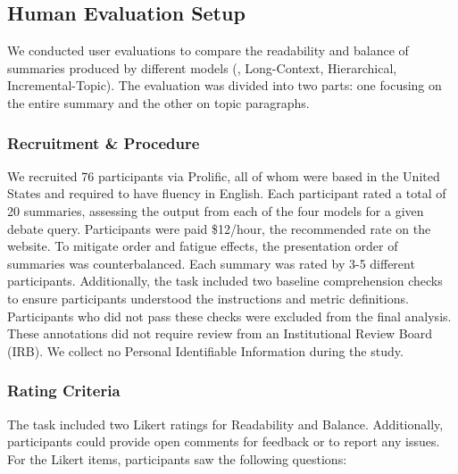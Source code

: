 \subsection{Human Evaluation Setup} \label{appendix:human}
We conducted user evaluations to compare the readability and balance of summaries produced by different models (\model, Long-Context, Hierarchical, Incremental-Topic). The evaluation was divided into two parts: one focusing on the entire summary and the other on topic paragraphs.

\subsubsection{Recruitment \& Procedure}
We recruited 76 participants via Prolific, all of whom were based in the United States and required to have fluency in English. Each participant rated a total of 20 summaries, assessing the output from each of the four models for a given debate query. 
Participants were paid \$12/hour, the recommended rate on the website.
To mitigate order and fatigue effects, the presentation order of summaries was counterbalanced. Each summary was rated by 3-5 different participants. Additionally, the task included two baseline comprehension checks to ensure participants understood the instructions and metric definitions. Participants who did not pass these checks were excluded from the final analysis.
These annotations did not require review from an Institutional Review Board (IRB).
We collect no Personal Identifiable Information during the study.


\subsubsection{Rating Criteria}
The task included two Likert ratings for Readability and Balance. Additionally, participants could provide open comments for feedback or to report any issues. For the Likert items, participants saw the following questions:

